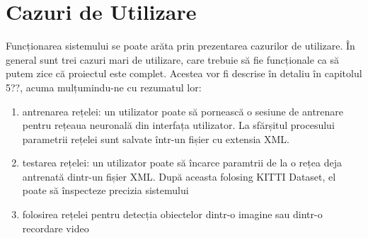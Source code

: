 \section{Cazuri de Utilizare}
Funcționarea sistemului se poate arăta prin prezentarea cazurilor de utilizare.\newline
În general sunt trei cazuri mari de utilizare, care trebuie să fie funcționale ca să putem zice că proiectul este complet. Acestea vor fi descrise în detaliu în capitolul 5??, acuma mulțumindu-ne cu rezumatul lor:
\begin{enumerate}
	\item antrenarea rețelei: un utilizator poate să pornească o sesiune de antrenare pentru rețeaua neuronală din interfața utilizator. La sfărșitul procesului parametrii rețelei sunt salvate într-un fișier cu extensia XML.
	\item testarea rețelei: un utilizator poate să încarce paramtrii de la o rețea deja antrenată dintr-un fișier XML. După aceasta folosing KITTI Dataset, el poate să înspecteze precizia sistemului
	\item folosirea rețelei pentru detecția obiectelor dintr-o imagine sau dintr-o recordare video
\end{enumerate}